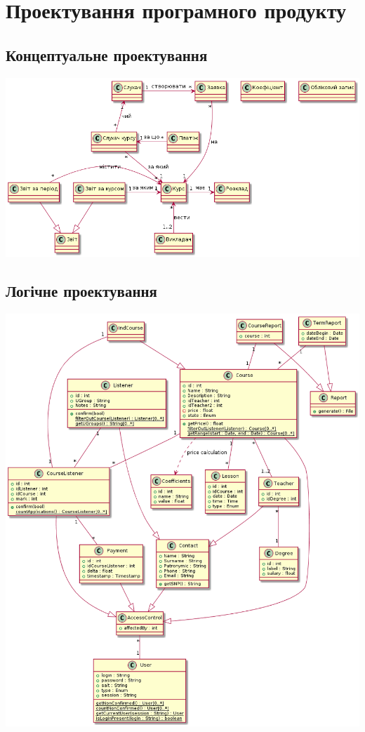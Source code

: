 \section{Проектування програмного продукту}
\subsection{Концептуальне проектування}
\noindent\includegraphics[width=17cm]{pp_pw3_conc.png}
\subsection{Логічне проектування}
\noindent\includegraphics[width=17cm]{pp_pw3_clas.png}

